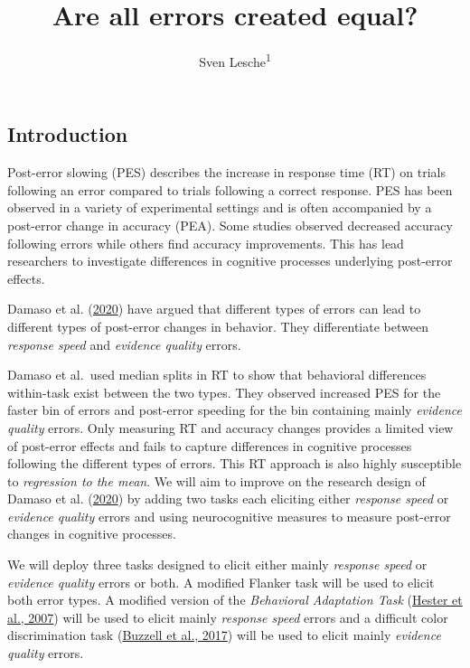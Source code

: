 \documentclass[
  man,floatsintext]{apa7}
\title{Are all errors created equal?}
\author{Sven Lesche\textsuperscript{1}}
\date{}
\affiliation{\vspace{0.5cm}\textsuperscript{1} Ruprecht-Karls-University Heidelberg}
\begin{document}
\maketitle

\hypertarget{introduction}{%
\subsection{Introduction}\label{introduction}}

Post-error slowing (PES) describes the increase in response time (RT) on trials following an error compared to trials following a correct response. PES has been observed in a variety of experimental settings and is often accompanied by a post-error change in accuracy (PEA). Some studies observed decreased accuracy following errors while others find accuracy improvements. This has lead researchers to investigate differences in cognitive processes underlying post-error effects.

Damaso et al. (\protect\hyperlink{ref-damaso2020}{2020}) have argued that different types of errors can lead to different types of post-error changes in behavior. They differentiate between \emph{response speed} and \emph{evidence quality} errors.

Damaso et al.~used median splits in RT to show that behavioral differences within-task exist between the two types. They observed increased PES for the faster bin of errors and post-error speeding for the bin containing mainly \emph{evidence quality} errors. Only measuring RT and accuracy changes provides a limited view of post-error effects and fails to capture differences in cognitive processes following the different types of errors. This RT approach is also highly susceptible to \emph{regression to the mean}. We will aim to improve on the research design of Damaso et al. (\protect\hyperlink{ref-damaso2020}{2020}) by adding two tasks each eliciting either \emph{response speed} or \emph{evidence quality} errors and using neurocognitive measures to measure post-error changes in cognitive processes.

We will deploy three tasks designed to elicit either mainly \emph{response speed} or \emph{evidence quality} errors or both. A modified Flanker task will be used to elicit both error types. A modified version of the \emph{Behavioral Adaptation Task} (\protect\hyperlink{ref-hester2007post}{Hester et al., 2007}) will be used to elicit mainly \emph{response speed} errors and a difficult color discrimination task (\protect\hyperlink{ref-buzzell2017error}{Buzzell et al., 2017}) will be used to elicit mainly \emph{evidence quality} errors.
\end{document}
